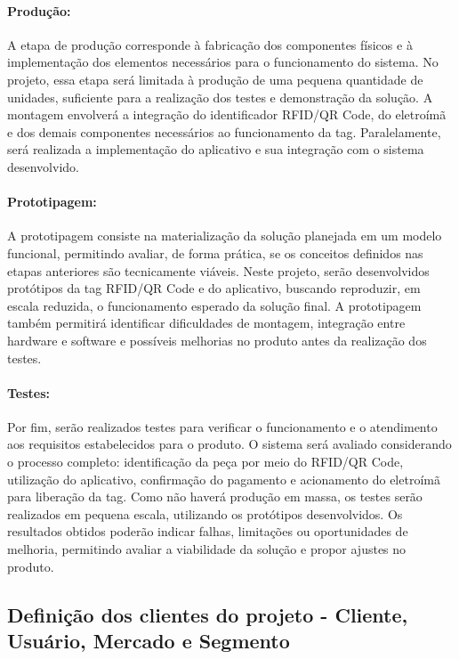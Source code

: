 \paragraph{Produção:}
\label{par:producao}

A etapa de produção corresponde à fabricação dos componentes físicos e à implementação dos elementos necessários para o funcionamento do sistema. No projeto, essa etapa será limitada à produção de uma pequena quantidade de unidades, suficiente para a realização dos testes e demonstração da solução. A montagem envolverá a integração do identificador RFID/QR Code, do eletroímã e dos demais componentes necessários ao funcionamento da tag. Paralelamente, será realizada a implementação do aplicativo e sua integração com o sistema desenvolvido.

\paragraph{Prototipagem:}
\label{par:prototipagem}

A prototipagem consiste na materialização da solução planejada em um modelo funcional, permitindo avaliar, de forma prática, se os conceitos definidos nas etapas anteriores são tecnicamente viáveis. Neste projeto, serão desenvolvidos protótipos da tag RFID/QR Code e do aplicativo, buscando reproduzir, em escala reduzida, o funcionamento esperado da solução final. A prototipagem também permitirá identificar dificuldades de montagem, integração entre hardware e software e possíveis melhorias no produto antes da realização dos testes.

\paragraph{Testes:}
\label{par:testes}

Por fim, serão realizados testes para verificar o funcionamento e o atendimento aos requisitos estabelecidos para o produto. O sistema será avaliado considerando o processo completo: identificação da peça por meio do RFID/QR Code, utilização do aplicativo, confirmação do pagamento e acionamento do eletroímã para liberação da tag. Como não haverá produção em massa, os testes serão realizados em pequena escala, utilizando os protótipos desenvolvidos. Os resultados obtidos poderão indicar falhas, limitações ou oportunidades de melhoria, permitindo avaliar a viabilidade da solução e propor ajustes no produto.




\subsection{Definição dos clientes do projeto - Cliente, Usuário, Mercado e Segmento}\label{subsec:definicao_dos_clientes}

